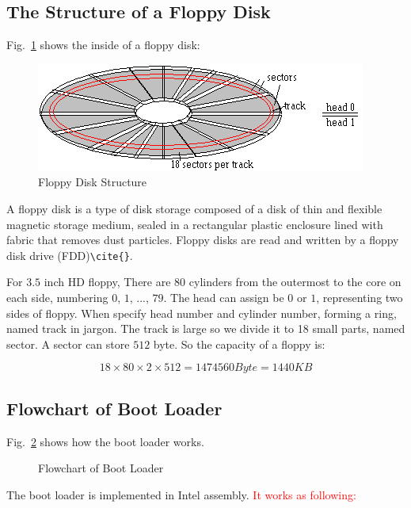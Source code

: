 \documentclass{swfcthesis}
\begin{document}
\subsection{The Structure of a Floppy Disk}
\label{sec:struct-floppy-disk}

Fig.~\ref{fig:flpy1.png} shows the inside of a floppy disk:
\begin{figure}[!ht]
  \centering
  \includegraphics[width=.5\textwidth]{../figs/bootLoader/flpy1.png}
  \caption{Floppy Disk Structure}
  \label{fig:flpy1.png}
\end{figure}

A floppy disk is a type of disk
storage composed of a disk of thin and flexible magnetic storage medium, sealed in a
rectangular plastic enclosure lined with fabric that removes dust particles. Floppy disks
are read and written by a floppy disk drive (FDD)\verb|\cite{}|.

For $3.5$ inch HD floppy,  There are $80$ cylinders from the outermost to
the core on each side, numbering $0$, $1$, ..., $79$. The head can assign be $0$ or $1$,
representing two sides of floppy. When specify head number and cylinder number, forming a
ring, named track in jargon. The track is large so we divide it to 18 small parts, named
sector. A sector can store $512$ byte. So the capacity of a floppy is:

$$18 \times 80 \times 2 \times 512 = 1474560 Byte = 1440 KB$$

\subsection{Flowchart of Boot Loader}
\label{sec:flowch-boot-load}

Fig.~\ref{fig:flowchart-of-boot-loader} shows how the boot loader works.
\begin{figure}[!ht]
  \centering
  \caption{Flowchart of Boot Loader}
  \label{fig:flowchart-of-boot-loader}
\end{figure}

The boot loader is implemented in Intel assembly. \textcolor{red}{It works as following:}
\end{document}
